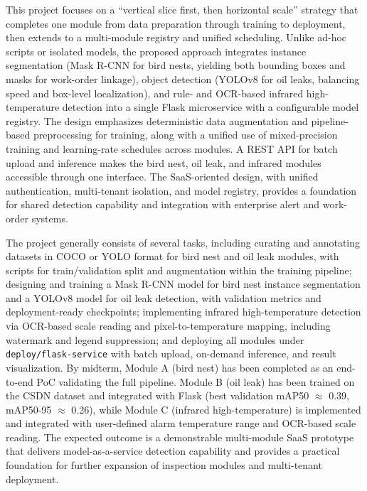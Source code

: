\documentclass[12pt,a4paper]{article}
\begin{document}
This project focuses on a ``vertical slice first, then horizontal scale'' strategy that completes one module from data preparation through training to deployment, then extends to a multi-module registry and unified scheduling. Unlike ad-hoc scripts or isolated models, the proposed approach integrates instance segmentation (Mask R-CNN for bird nests, yielding both bounding boxes and masks for work-order linkage), object detection (YOLOv8 for oil leaks, balancing speed and box-level localization), and rule- and OCR-based infrared high-temperature detection into a single Flask microservice with a configurable model registry. The design emphasizes deterministic data augmentation and pipeline-based preprocessing for training, along with a unified use of mixed-precision training and learning-rate schedules across modules. A REST API for batch upload and inference makes the bird nest, oil leak, and infrared modules accessible through one interface. The SaaS-oriented design, with unified authentication, multi-tenant isolation, and model registry, provides a foundation for shared detection capability and integration with enterprise alert and work-order systems.

The project generally consists of several tasks, including curating and annotating datasets in COCO or YOLO format for bird nest and oil leak modules, with scripts for train/validation split and augmentation within the training pipeline; designing and training a Mask R-CNN model for bird nest instance segmentation and a YOLOv8 model for oil leak detection, with validation metrics and deployment-ready checkpoints; implementing infrared high-temperature detection via OCR-based scale reading and pixel-to-temperature mapping, including watermark and legend suppression; and deploying all modules under \texttt{deploy/flask-service} with batch upload, on-demand inference, and result visualization. By midterm, Module A (bird nest) has been completed as an end-to-end PoC validating the full pipeline. Module B (oil leak) has been trained on the CSDN dataset and integrated with Flask (best validation mAP50 $\approx$ 0.39, mAP50-95 $\approx$ 0.26), while Module C (infrared high-temperature) is implemented and integrated with user-defined alarm temperature range and OCR-based scale reading. The expected outcome is a demonstrable multi-module SaaS prototype that delivers model-as-a-service detection capability and provides a practical foundation for further expansion of inspection modules and multi-tenant deployment.

\end{document}
